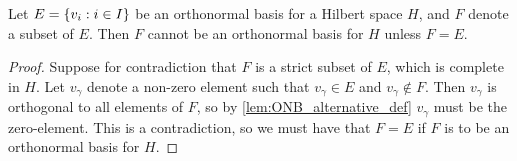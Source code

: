 \documentclass[../thesis.tex]{subfiles}
\begin{document}


\begin{lemma}\label{lem:onb_direct_subset}
    Let $E = \{v_i: i \in I\}$ be an orthonormal basis for a Hilbert space $H$, and $F$ denote a subset of $E$. Then $F$ cannot be an orthonormal basis for $H$ unless $F = E$.
\end{lemma}
\begin{proof}
    Suppose for contradiction that $F$ is a strict subset of $E$, which is complete in $H$. Let $v_\gamma$ denote a non-zero element such that $v_{\gamma}\in E$ and $v_{\gamma}\notin F$. Then $v_{\gamma}$ is orthogonal to all elements of $F$, so by \cref{lem:ONB_alternative_def} $v_{\gamma}$ must be the zero-element. This is a contradiction, so we must have that $F=E$ if $F$ is to be an orthonormal basis for $H$.
\end{proof}
\end{document}
